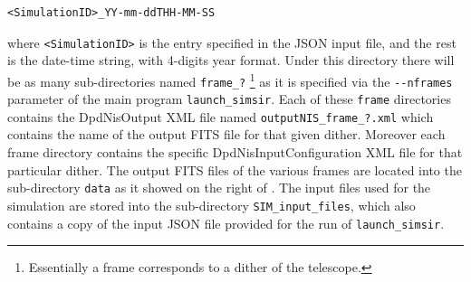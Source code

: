 \begin{verbatim}
<SimulationID>_YY-mm-ddTHH-MM-SS
\end{verbatim}

where \verb+<SimulationID>+ is the entry specified in the JSON input file, and the rest is the date-time string, with 4-digits year format. Under this directory there will be as many sub-directories named \verb+frame_?+ \footnote{Essentially a frame corresponds to a dither of the telescope.} as it is specified via the \verb+--nframes+ parameter of the main program \verb+launch_simsir+. Each of these \verb+frame+ directories contains the DpdNisOutput XML file named \verb+outputNIS_frame_?.xml+ which contains the name of the output FITS file for that given dither. Moreover each frame directory contains the specific DpdNisInputConfiguration XML file for that particular dither. The output FITS files of the various frames are located into the sub-directory \verb+data+ as it showed on the right of . The input files used for the simulation are stored into the sub-directory \verb+SIM_input_files+, which also contains a copy of the input JSON file provided for the run of \verb+launch_simsir+.